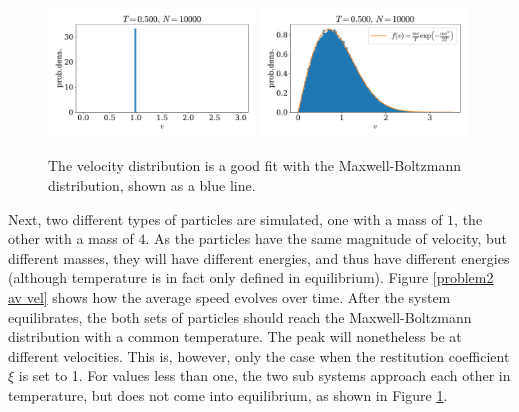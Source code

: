 \documentclass{article}
\begin{document}
            \begin{figure}[h]
                \centering
                \includegraphics[width=0.49\textwidth]{../plots/problem1/2/vel_dist.pdf}
                \includegraphics[width=0.49\textwidth]{../plots/problem1/vel_dist.pdf}
                \caption{The velocity distribution is a good fit with the Maxwell-Boltzmann distribution, shown as a blue line.}
                \label{problem1 dist}
            \end{figure}

            Next, two different types of particles are simulated, one with a mass of $1$, the other with a mass of $4$. As the particles have the same magnitude of velocity, but different masses, they will have different energies, and thus have different energies (although temperature is in fact only defined in equilibrium). Figure \ref{problem2 av vel} shows how the average speed evolves over time. After the system equilibrates, the both sets of particles should reach the Maxwell-Boltzmann distribution with a common temperature. The peak will nonetheless be at different velocities. This is, however, only the case when the restitution coefficient $\xi$ is set to 1. For values less than one, the two sub systems approach each other in temperature, but does not come into equilibrium, as shown in Figure \ref{problem1 dist}.
\end{document}
